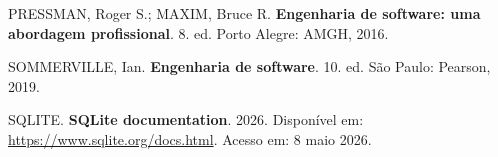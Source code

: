 \documentclass[12pt,oneside,a4paper,brazil,final]{abntex2}
\begin{document}
\begin{SingleSpace}
\noindent

PRESSMAN, Roger S.; MAXIM, Bruce R. \textbf{Engenharia de software: uma abordagem profissional}. 8. ed. Porto Alegre: AMGH, 2016.



\vspace{0.5cm}



\noindent

SOMMERVILLE, Ian. \textbf{Engenharia de software}. 10. ed. São Paulo: Pearson, 2019.



\vspace{0.5cm}



\noindent

SQLITE. \textbf{SQLite documentation}. 2026. Disponível em: \url{https://www.sqlite.org/docs.html}. Acesso em: 8 maio 2026.



\end{SingleSpace}





\end{document}
